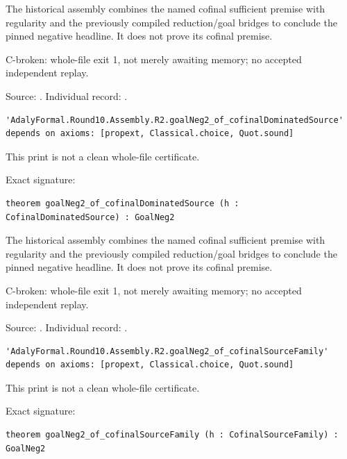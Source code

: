 \begin{theorem}
\label{join-1}
The historical assembly combines the named cofinal sufficient premise with regularity and the previously compiled reduction/goal bridges to conclude the pinned negative headline. It does not prove its cofinal premise.
\par C-broken: whole-file exit 1, not merely awaiting memory; no accepted independent replay.
\par Source: \texttt{}. Individual record: \texttt{}.
\begin{verbatim}
'AdalyFormal.Round10.Assembly.R2.goalNeg2_of_cofinalDominatedSource' depends on axioms: [propext, Classical.choice, Quot.sound]
\end{verbatim}
This print is not a clean whole-file certificate.
\par Exact signature:
\begin{verbatim}
theorem goalNeg2_of_cofinalDominatedSource (h : CofinalDominatedSource) : GoalNeg2
\end{verbatim}
\end{theorem}

\begin{theorem}
\label{join-2}
The historical assembly combines the named cofinal sufficient premise with regularity and the previously compiled reduction/goal bridges to conclude the pinned negative headline. It does not prove its cofinal premise.
\par C-broken: whole-file exit 1, not merely awaiting memory; no accepted independent replay.
\par Source: \texttt{}. Individual record: \texttt{}.
\begin{verbatim}
'AdalyFormal.Round10.Assembly.R2.goalNeg2_of_cofinalSourceFamily' depends on axioms: [propext, Classical.choice, Quot.sound]
\end{verbatim}
This print is not a clean whole-file certificate.
\par Exact signature:
\begin{verbatim}
theorem goalNeg2_of_cofinalSourceFamily (h : CofinalSourceFamily) : GoalNeg2
\end{verbatim}
\end{theorem}

